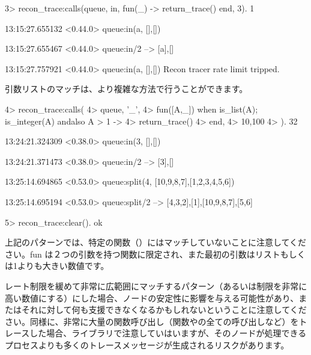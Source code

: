 \begin{VerbatimEshell}
3> recon_trace:calls({queue, in, fun(_) -> return_trace() end}, 3).
1

13:15:27.655132 <0.44.0> queue:in(a, {[],[]})

13:15:27.655467 <0.44.0> queue:in/2 --> {[a],[]}

13:15:27.757921 <0.44.0> queue:in(a, {[],[]})
Recon tracer rate limit tripped.
\end{VerbatimEshell}

引数リストのマッチは、より複雑な方法で行うことができます。


\begin{VerbatimEshell}
4> recon_trace:calls(
4>   {queue, '_',
4>    fun([A,_]) when is_list(A); is_integer(A) andalso A > 1 ->
4>        return_trace()
4>    end},
4>   {10,100}
4> ).
32

13:24:21.324309 <0.38.0> queue:in(3, {[],[]})

13:24:21.371473 <0.38.0> queue:in/2 --> {[3],[]}

13:25:14.694865 <0.53.0> queue:split(4, {[10,9,8,7],[1,2,3,4,5,6]})

13:25:14.695194 <0.53.0> queue:split/2 --> {{[4,3,2],[1]},{[10,9,8,7],[5,6]}}

5> recon_trace:clear().
ok
\end{VerbatimEshell}

上記のパターンでは、特定の関数（）にはマッチしていないことに注意してください。fun は２つの引数を持つ関数に限定され、また最初の引数はリストもしくは1よりも大きい数値です。

レート制限を緩めて非常に広範囲にマッチするパターン（あるいは制限を非常に高い数値にする）にした場合、ノードの安定性に影響を与える可能性があり、またはそれに対して何も支援できなくなるかもしれないということに注意してください。同様に、非常に大量の関数呼び出し（関数やの全ての呼び出しなど）をトレースした場合、ライブラリで注意していはいますが、そのノードが処理できるプロセスよりも多くのトレースメッセージが生成されるリスクがあります。

